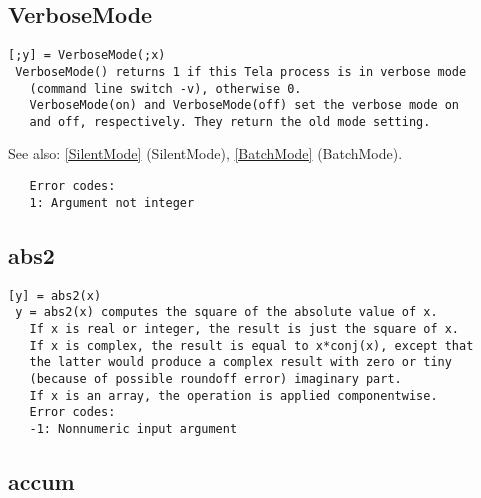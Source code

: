 \documentclass[a4paper]{article}
\begin{document}
\subsection{VerboseMode\label{VerboseMode}}

\begin{tscreen}
\begin{verbatim}
[;y] = VerboseMode(;x)
 VerboseMode() returns 1 if this Tela process is in verbose mode
   (command line switch -v), otherwise 0.
   VerboseMode(on) and VerboseMode(off) set the verbose mode on
   and off, respectively. They return the old mode setting.
\end{verbatim}

See also: \ref{SilentMode} {(SilentMode)}, \ref{BatchMode} {(BatchMode)}.
\begin{verbatim}
   Error codes:
   1: Argument not integer 
\end{verbatim}
\end{tscreen}





\subsection{abs2\label{abs2}}

\begin{tscreen}
\begin{verbatim}
[y] = abs2(x)
 y = abs2(x) computes the square of the absolute value of x.
   If x is real or integer, the result is just the square of x.
   If x is complex, the result is equal to x*conj(x), except that
   the latter would produce a complex result with zero or tiny
   (because of possible roundoff error) imaginary part.
   If x is an array, the operation is applied componentwise.
   Error codes:
   -1: Nonnumeric input argument 
\end{verbatim}
\end{tscreen}





\subsection{accum\label{accum}}
\end{document}
